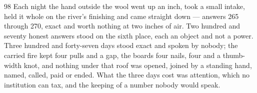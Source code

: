 \begin{CRchronicle}{98}
Each night the hand outside the wool went up an inch, took a small intake, held it whole on the river’s finishing and came straight down — answers 265 through 270, exact and worth nothing at two inches of air. Two hundred and seventy honest answers stood on the sixth place, each an object and not a power. Three hundred and forty-seven days stood exact and spoken by nobody; the carried fire kept four pulls and a gap, the boards four nails, four and a thumb-width knot, and nothing under that roof was opened, joined by a standing hand, named, called, paid or ended. What the three days cost was attention, which no institution can tax, and the keeping of a number nobody would speak.
\end{CRchronicle}
